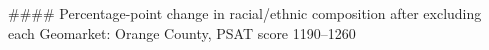 #### Percentage-point change in racial/ethnic composition after excluding each Geomarket: Orange County, PSAT score 1190–1260
